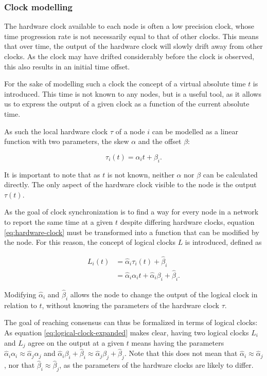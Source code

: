 \documentclass[a4paper,12pt]{article}
\begin{document}
\subsubsection{Clock modelling}

The hardware clock available to each node is often a low precision clock, whose time progression rate is not necessarily equal to that of other clocks. This means that over time, the output of the hardware clock will slowly drift away from other clocks. As the clock may have drifted considerably before the clock is observed, this also results in an initial time offset.

For the sake of modelling such a clock the concept of a virtual absolute time $t$ is introduced. This time is not known to any nodes, but is a useful tool, as it allows us to express the output of a given clock as a function of the current absolute time.

As such the local hardware clock $\tau$ of a node $i$ can be modelled as a linear function with two parameters, the skew $\alpha$ and the offset $\beta$:


\begin{equation}\label{eq:hardware-clock}
    \tau_i(t) = \alpha_i t + \beta_i.
\end{equation}

It is important to note that as $t$ is not known, neither $\alpha$ nor $\beta$ can be calculated directly. The only aspect of the hardware clock visible to the node is the output $\tau(t)$.

As the goal of clock synchronization is to find a way for every node in a network to report the same time at a given $t$ despite differing hardware clocks, equation \ref{eq:hardware-clock} must be transformed into a function that can be modified by the node. For this reason, the concept of logical clocks $L$ is introduced, defined as

\begin{align}
    L_i(t) &= \hat\alpha_i \tau_i(t) + \hat\beta_i \nonumber \\
        &= \hat\alpha_i \alpha_i t + \hat\alpha_i \beta_i + \hat\beta_i. \label{eq:logical-clock-expanded}
\end{align}

Modifying $\hat\alpha_i$ and $\hat\beta_i$ allows the node to change the output of the logical clock in relation to $t$, without knowing the parameters of the hardware clock $\tau$.

The goal of reaching consensus can thus be formalized in terms of logical clocks: As equation \ref{eq:logical-clock-expanded} makes clear, having two logical clocks $L_i$ and $L_j$ agree on the output at a given $t$ means having the parameters $\hat\alpha_i \alpha_i \approx \hat\alpha_j \alpha_j$ and $\hat\alpha_i \beta_i + \hat\beta_i \approx \hat\alpha_j \beta_j + \hat\beta_j$. Note that this does not mean that $\hat\alpha_i \approx \hat\alpha_j$, nor that $\hat\beta_i \approx \hat\beta_j$, as the parameters of the hardware clocks are likely to differ.
\end{document}
